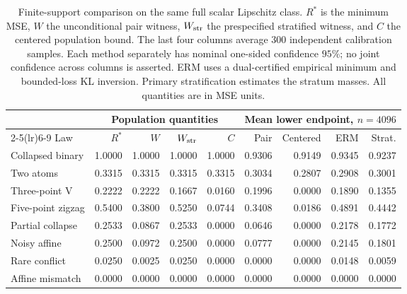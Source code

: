 \begin{table}[t]
\centering\small
\setlength{\tabcolsep}{3pt}
\begin{tabular}{lrrrrrrrr}
\toprule
& \multicolumn{4}{c}{Population quantities} & \multicolumn{4}{c}{Mean lower endpoint, $n=4096$} \\
\cmidrule(lr){2-5}\cmidrule(lr){6-9}
Law & $R^*$ & $W$ & $W_{\rm str}$ & $C$ & Pair & Centered & ERM & Strat. \\
\midrule
Collapsed binary & 1.0000 & 1.0000 & 1.0000 & 1.0000 & 0.9306 & 0.9149 & 0.9345 & 0.9237 \\
Two atoms & 0.3315 & 0.3315 & 0.3315 & 0.3315 & 0.3034 & 0.2807 & 0.2908 & 0.3001 \\
Three-point V & 0.2222 & 0.2222 & 0.1667 & 0.0160 & 0.1996 & 0.0000 & 0.1890 & 0.1355 \\
Five-point zigzag & 0.5400 & 0.3800 & 0.5250 & 0.0744 & 0.3408 & 0.0186 & 0.4891 & 0.4442 \\
Partial collapse & 0.2533 & 0.0867 & 0.2533 & 0.0000 & 0.0646 & 0.0000 & 0.2178 & 0.1772 \\
Noisy affine & 0.2500 & 0.0972 & 0.2500 & 0.0000 & 0.0777 & 0.0000 & 0.2145 & 0.1801 \\
Rare conflict & 0.0250 & 0.0025 & 0.0250 & 0.0000 & 0.0000 & 0.0000 & 0.0148 & 0.0059 \\
Affine mismatch & 0.0000 & 0.0000 & 0.0000 & 0.0000 & 0.0000 & 0.0000 & 0.0000 & 0.0000 \\
\bottomrule
\end{tabular}
\caption{Finite-support comparison on the same full scalar Lipschitz class. $R^*$ is the minimum MSE, $W$ the unconditional pair witness, $W_{\rm str}$ the prespecified stratified witness, and $C$ the centered population bound. The last four columns average 300 independent calibration samples. Each method separately has nominal one-sided confidence $95\%$; no joint confidence across columns is asserted. ERM uses a dual-certified empirical minimum and bounded-loss KL inversion. Primary stratification estimates the stratum masses. All quantities are in MSE units.}
\label{tab:witness-comparison}
\end{table}
